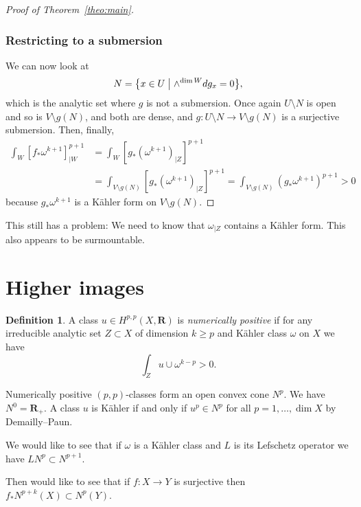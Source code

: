 \documentclass[11pt]{amsart}
\theoremstyle{definition}
\newtheorem{defi}[theo]{Definition}
\def\RR{\mathbf{R}}
\begin{document}
\begin{proof}[Proof of Theorem~\ref{theo:main}]
\subsubsection*{Restricting to a submersion}

We can now look at
\[
N = 
\bigl\{
x \in U 
\bigm| \wedge^{\dim W} dg_x = 0 
\bigr\},
\]
which is the analytic set where $g$ is not a submersion.
Once again $U \setminus N$ is open and so is $V \setminus g(N)$, and both are dense, and $g : U \setminus N \to V \setminus g(N)$ is a surjective submersion.
Then, finally,
\begin{align*}
\int_W [f_*\omega^{k+1}]_{|W}^{p+1}
&= \int_W [g_*(\omega^{k+1})_{|Z}]^{p+1}
\\
&= \int_{V \setminus g(N)} [g_*(\omega^{k+1})_{|Z}]^{p+1}
= \int_{V \setminus g(N)} (g_*\omega^{k+1})^{p+1} > 0
\end{align*}
because $g_*\omega^{k+1}$ is a K\"ahler form on $V \setminus g(N)$. 
\end{proof}


This still has a problem:
We need to know that $\omega_{|Z}$ contains a K\"ahler form.
This also appears to be surmountable.



\section{Higher images}


\begin{defi}
A class $u \in H^{p,p}(X,\RR)$ is \emph{numerically positive} if for any irreducible analytic set $Z \subset X$ of dimension $k \geq p$ and K\"ahler class $\omega$ on $X$ we have
\[
\int_Z u \cup \omega^{k-p} > 0.
\]
\end{defi}


Numerically positive $(p,p)$-classes form an open convex cone $N^p$.
We have $N^0 = \RR_+$.
A class $u$ is K\"ahler if and only if $u^p \in N^p$ for all $p = 1, \ldots, \dim X$ by Demailly--Paun.

We would like to see that if $\omega$ is a K\"ahler class and $L$ is its Lefschetz operator we have $L N^p \subset N^{p+1}$.

Then would like to see that if $f : X \to Y$ is surjective then $f_* N^{p+k}(X) \subset N^p(Y)$.







\end{document}
